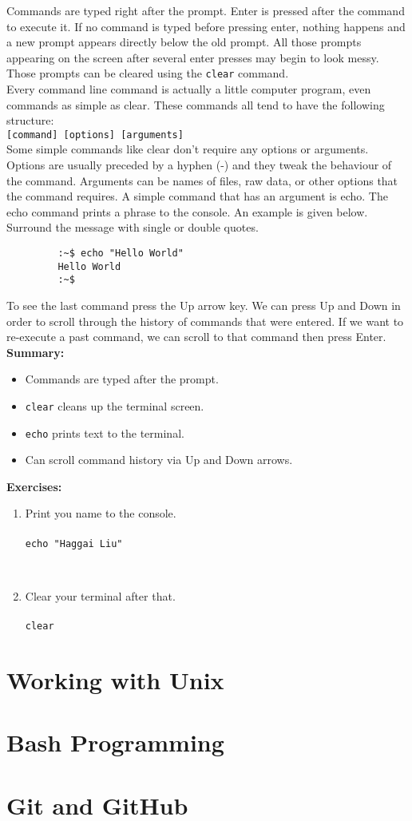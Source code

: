 \documentclass[12pt]{article}
\newcommand{\code}[1]{
\texttt{#1}
}
\begin{document}
		 Commands are typed right after the prompt. Enter is pressed after the command to execute it. If no command is typed before pressing enter, nothing happens and a new prompt appears directly below the old prompt. All those prompts appearing on the screen after several enter presses may begin to look messy. Those prompts can be cleared using the \code{clear} command.\\
		 
		 Every command line command is actually a little computer program, even commands as simple as clear. These commands all tend to have the following structure:\\
		 \code{[command] [options] [arguments]}\\
		 
		 Some simple commands like clear don't require any options or arguments. Options are usually preceded by a hyphen (-) and they tweak the behaviour of the command. Arguments can be names of files, raw data, or other options that the command requires. A simple command that has an argument is echo. The echo command prints a phrase to the console. An example is given below. Surround the message with single or double quotes.
		 
		 \begin{verbatim}
		 :~$ echo "Hello World"
		 Hello World
		 :~$
		 \end{verbatim}
		 
		 To see the last command press the Up arrow key. We can press Up and Down in order to scroll through the history of commands that were entered. If we want to re-execute a past command, we can scroll to that command then press Enter. \\
		 
		 \textbf{Summary:}
		 \begin{itemize}
		 \item Commands are typed after the prompt.
		 \item \code{clear} cleans up the terminal screen.
		 \item \code{echo} prints text to the terminal.
		 \item Can scroll command history via Up and Down arrows.
		 \end{itemize}
		 
		 \textbf{Exercises:}
		 
		 \begin{enumerate}
		 \item Print you name to the console.\\\\
		 \code{echo "Haggai Liu"}
		 \\
		 \item Clear your terminal after that.\\\\
		 \code{clear}\\
		 \end{enumerate}
	
	\section{Working with Unix}
	
	
	\section{Bash Programming}
	
	
	\section{Git and GitHub}
	
\end{document}
